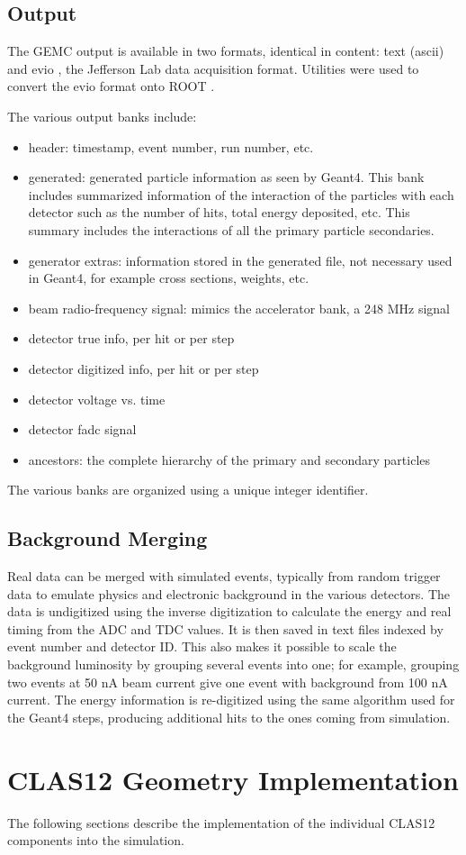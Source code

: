 \subsection{Output}

The GEMC output is available in two formats, identical in content: text (ascii) and evio \cite{evio}, the Jefferson Lab
data acquisition format.
Utilities were used to convert the evio format onto ROOT \cite{root}.

The various output banks include:

\begin{itemize}
	\item header: timestamp, event number, run number, etc.
	\item generated: generated particle information as seen by Geant4. This bank includes summarized information of the interaction of
                     the particles with each detector such as the number of hits, total energy deposited, etc. This summary includes
                     the interactions of all the primary particle secondaries.
	\item generator extras: information stored in the generated file, not necessary used in Geant4, for example cross sections, weights, etc.
	\item beam radio-frequency signal: mimics the accelerator bank, a 248 MHz signal
	\item detector true info, per hit or per step
	\item detector digitized info, per hit or per step
	\item detector voltage vs. time
	\item detector fadc signal
	\item ancestors: the complete hierarchy of the primary and secondary particles
\end{itemize}

The various banks are organized using a unique integer identifier.

\subsection{Background Merging}

Real data can be merged with simulated events, typically from random trigger data to emulate physics and electronic background in
the various detectors.
The data is un\-digitized using the inverse digitization to calculate the energy and real timing from the ADC and TDC values.
It is then saved in text files indexed by event number and detector ID. This also makes it possible to scale the background luminosity by grouping
several events into one; for example, grouping two events at 50 nA beam current give one event with background from 100 nA current.
The energy information is re-digitized using the same algorithm used for the Geant4 steps, producing additional hits to the ones coming from simulation.



\section{CLAS12 Geometry Implementation}

The following sections describe the implementation of the individual CLAS12 components into the simulation.
